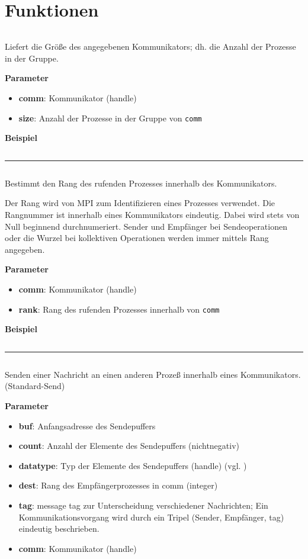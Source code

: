 \section{Funktionen}
\inputminted[numbersep=5pt, tabsize=4]{c}{scripts/mpi/comm-size.c}%
Liefert die Größe des angegebenen Kommunikators; dh. die Anzahl der Prozesse in der Gruppe.

\textbf{Parameter}
\begin{itemize}
    \item \textbf{comm}: Kommunikator (handle)
    \item \textbf{size}: Anzahl der Prozesse in der Gruppe von \texttt{comm}
\end{itemize}

\textbf{Beispiel}
\inputminted[numbersep=5pt, tabsize=4]{c}{scripts/mpi/comm-size-example.c}
\goodbreak
\rule{\textwidth}{0.4pt}%
\inputminted[numbersep=5pt, tabsize=4]{c}{scripts/mpi/comm-rank.c}
Bestimmt den Rang des rufenden Prozesses innerhalb des Kommunikators.

Der Rang wird von MPI zum Identifizieren eines Prozesses verwendet. Die Rangnummer ist innerhalb eines Kommunikators eindeutig. Dabei wird stets von Null beginnend durchnumeriert. Sender und Empfänger bei Sendeoperationen oder die Wurzel bei kollektiven Operationen werden immer mittels Rang angegeben.

\textbf{Parameter}
\begin{itemize}
    \item \textbf{comm}: Kommunikator (handle)
    \item \textbf{rank}: Rang des rufenden Prozesses innerhalb von \texttt{comm}
\end{itemize}

\textbf{Beispiel}
\inputminted[numbersep=5pt, tabsize=4]{c}{scripts/mpi/comm-rank-example.c}
\goodbreak
\rule{\textwidth}{0.4pt}%
\inputminted[numbersep=5pt, tabsize=4]{c}{scripts/mpi/mpi-send.c}
Senden einer Nachricht an einen anderen Prozeß innerhalb eines Kommunikators. (Standard-Send)

\textbf{Parameter}
\begin{itemize}
    \item \textbf{buf}: Anfangsadresse des Sendepuffers 
    \item \textbf{count}: Anzahl der Elemente des Sendepuffers (nichtnegativ) 
    \item \textbf{datatype}: Typ der Elemente des Sendepuffers (handle) (vgl. )
    \item \textbf{dest}: Rang des Empfängerprozesses in comm (integer)
    \item \textbf{tag}: message tag zur Unterscheidung verschiedener Nachrichten; 
Ein Kommunikationsvorgang wird durch ein Tripel (Sender, Empfänger, tag) eindeutig beschrieben. 
    \item \textbf{comm}: Kommunikator (handle)
\end{itemize}

